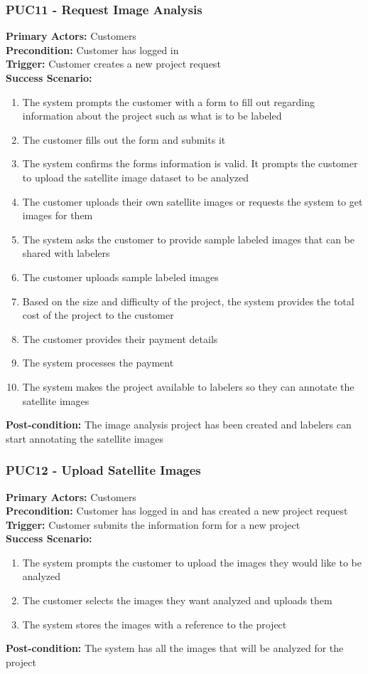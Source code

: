 \documentclass[12pt]{article}
\begin{document}
\subsubsection*{PUC11 - Request Image Analysis}
\label{sec:PUC11}
\textbf{Primary Actors:} Customers\\
\textbf{Precondition:} Customer has logged in\\
\textbf{Trigger:} Customer creates a new project request\\
\textbf{Success Scenario:}
\begin{enumerate}
    \item The system prompts the customer with a form to fill out regarding information about the project such as what is to be labeled
    \item The customer fills out the form and submits it
    \item The system confirms the forms information is valid. It prompts the customer to upload the satellite image dataset to be analyzed
    \item The customer uploads their own satellite images or requests the system to get images for them
    \item The system asks the customer to provide sample labeled images that can be shared with labelers
    \item The customer uploads sample labeled images
    \item Based on the size and difficulty of the project, the system provides the total cost of the project to the customer
    \item The customer provides their payment details
    \item The system processes the payment
    \item The system makes the project available to labelers so they can annotate the satellite images
\end{enumerate}
\textbf{Post-condition:} The image analysis project has been created and labelers can start annotating the satellite images

\subsubsection*{PUC12 - Upload Satellite Images}
\label{sec:PUC12}
\textbf{Primary Actors:} Customers\\
\textbf{Precondition:} Customer has logged in and has created a new project request\\
\textbf{Trigger:} Customer submits the information form for a new project\\
\textbf{Success Scenario:}
\begin{enumerate}
    \item The system prompts the customer to upload the images they would like to be analyzed
    \item The customer selects the images they want analyzed and uploads them
    \item The system stores the images with a reference to the project
\end{enumerate}
\textbf{Post-condition:} The system has all the images that will be analyzed for the project
\end{document}
